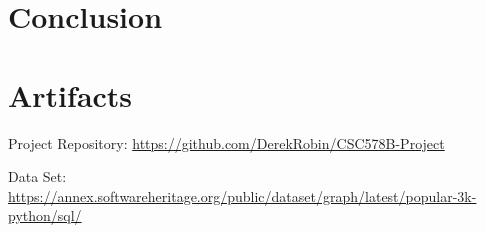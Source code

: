 \documentclass[acmconf]{acmart}
\begin{document}
\section{Conclusion} \label{conclusion}




\appendix

\section{Artifacts} \label{artifacts}
Project Repository: \url{https://github.com/DerekRobin/CSC578B-Project}

Data Set: \url{https://annex.softwareheritage.org/public/dataset/graph/latest/popular-3k-python/sql/}
\end{document}
